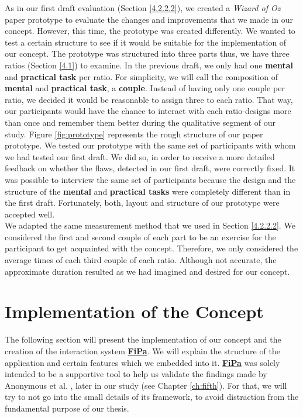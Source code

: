 As in our first draft evaluation (Section \ref{4.2.2.2}), we created a \textit{Wizard of Oz} paper prototype \cite{Butz2014} to evaluate the changes and improvements that we made in our concept. However, this time, the prototype was created differently. We wanted to test a certain structure to see if it would be suitable for the implementation of our concept. The prototype was structured into three parts thus, we have three ratios (Section \ref{4.1}) to examine. In the previous draft, we only had one \textbf{mental} and \textbf{practical task} per ratio. For simplicity, we will call the composition of \textbf{mental} and \textbf{practical task}, a \textbf{couple}. Instead of having only one couple per ratio, we decided it would be reasonable to assign three to each ratio. That way, our participants would have the chance to interact with each ratio-designs more than once and remember them better during the qualitative segment of our study. Figure \ref{fig:prototype} represents the rough structure of our paper prototype. We tested our prototype with the same set of participants with whom we had tested our first draft. We did so, in order to receive a more detailed feedback on whether the flaws, detected in our first draft, were correctly fixed. It was possible to interview the same set of participants because the design and the structure of the \textbf{mental} and \textbf{practical tasks} were completely different than in the first draft. Fortunately, both, layout and structure of our prototype were accepted well. \\

We adapted the same measurement method that we used in Section \ref{4.2.2.2}. We considered the first and second couple of each part to be an exercise for the participant to get acquainted with the concept. Therefore, we only considered the average times of each third couple of each ratio. Although not accurate, the approximate duration resulted as we had imagined and desired for our concept.

\section{Implementation of the Concept} \label{4.3}

The following section will present the implementation of our concept and the creation of the interaction system \underline{\textbf{FiPa}}. We will explain the structure of the application and certain features which we embedded into it. \underline{\textbf{FiPa}} was solely intended to be a supportive tool to help us validate the findings made by Anonymous et al. \cite{anonymous}, later in our study (see Chapter \ref{ch:fifth}). For that, we will try to not go into the small details of its framework, to avoid distraction from the fundamental purpose of our thesis.\\

